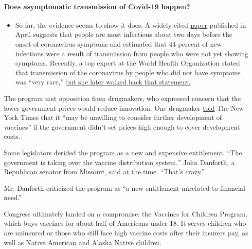 \begin{itemize}
{  \paragraph{Does asymptomatic transmission of Covid-19
  happen?}\label{does-asymptomatic-transmission-of-covid-19-happen}}

  \begin{itemize}
  \tightlist
  \item
    So far, the evidence seems to show it does. A widely cited
    \href{https://www.nature.com/articles/s41591-020-0869-5}{paper}
    published in April suggests that people are most infectious about
    two days before the onset of coronavirus symptoms and estimated that
    44 percent of new infections were a result of transmission from
    people who were not yet showing symptoms. Recently, a top expert at
    the World Health Organization stated that transmission of the
    coronavirus by people who did not have symptoms was ``very rare,''
    \href{https://www.nytimes3xbfgragh.onion/2020/06/09/world/coronavirus-updates.html?action=click\&pgtype=Article\&state=default\&region=MAIN_CONTENT_3\&context=storylines_faq\#link-1f302e21}{but
    she later walked back that statement.}
  \end{itemize}
\end{itemize}

The program met opposition from drugmakers, who expressed concern that
the lower government prices would reduce innovation. One drugmaker
\href{https://timesmachine.nytimes3xbfgragh.onion/timesmachine/1993/04/02/175993.html?pageNumber=20}{told}
The New York Times that it ``may be unwilling to consider further
development of vaccines'' if the government didn't set prices high
enough to cover development costs.

Some legislators derided the program as a new and expensive entitlement.
``The government is taking over the vaccine distribution system,'' John
Danforth, a Republican senator from Missouri,
\href{https://timesmachine.nytimes3xbfgragh.onion/timesmachine/1994/05/30/242993.html?pageNumber=1}{said
at the time}. ``That's crazy.''

Mr. Danforth criticized the program as ``a new entitlement unrelated to
financial need.''

Congress ultimately landed on a compromise: the Vaccines for Children
Program, which buys vaccines for about half of Americans under 18. It
serves children who are uninsured or those who still face high vaccine
costs after their insurers pay, as well as Native American and Alaska
Native children.

